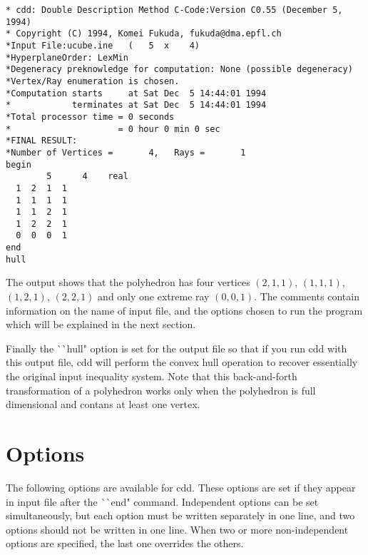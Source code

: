\begin{verbatim}
* cdd: Double Description Method C-Code:Version C0.55 (December 5, 1994)
* Copyright (C) 1994, Komei Fukuda, fukuda@dma.epfl.ch
*Input File:ucube.ine   (   5  x    4)
*HyperplaneOrder: LexMin
*Degeneracy preknowledge for computation: None (possible degeneracy)
*Vertex/Ray enumeration is chosen.
*Computation starts     at Sat Dec  5 14:44:01 1994
*            terminates at Sat Dec  5 14:44:01 1994
*Total processor time = 0 seconds
*                     = 0 hour 0 min 0 sec
*FINAL RESULT:
*Number of Vertices =       4,   Rays =       1
begin
        5      4    real
  1  2  1  1
  1  1  1  1
  1  1  2  1
  1  2  2  1
  0  0  0  1
end
hull
\end{verbatim}

The output shows that the polyhedron has four vertices
$(2,1,1)$, $(1,1,1)$, $(1,2,1)$, $(2,2,1)$ and
only one extreme ray $(0,0,1)$.  The comments contain
information on the name of input file, and the options
chosen to run the program which will be explained in
the next section.  

Finally the ^^ ^^ hull" option is  set for
the output file so that if you run cdd with this output file,
cdd will perform the convex hull operation to recover 
essentially the original input inequality system.  Note that
this back-and-forth transformation of a polyhedron works
only when the polyhedron is full dimensional and contans
at least one vertex.

\section{Options}  \label{OPTIONS}

The following options are available for cdd.  These options are
set if they appear in input file after the ^^ ^^ end" command.
Independent options can be set simultaneously, but each option
must be written separately in one line, and  two options
should not be written in one line.  When two or more non-independent
options are specified, the last one overrides the others.

